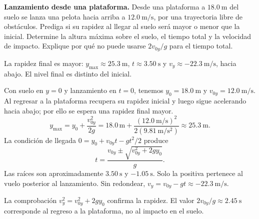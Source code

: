 \begin{ejercicio}
\textbf{Lanzamiento desde una plataforma.} Desde una plataforma a \(\SI{18.0}{\meter}\) del suelo se lanza una pelota hacia arriba a \(\SI{12.0}{\meter\per\second}\), por una trayectoria libre de obstáculos. Prediga si su rapidez al llegar al suelo será mayor o menor que la inicial. Determine la altura máxima sobre el suelo, el tiempo total y la velocidad de impacto. Explique por qué no puede usarse \(2v_{0y}/g\) para el tiempo total.
\end{ejercicio}
\begin{respuesta}
La rapidez final es mayor: \(y_{\max}\approx\SI{25.3}{\meter}\), \(t\approx\SI{3.50}{\second}\) y \(v_y\approx-\SI{22.3}{\meter\per\second}\), hacia abajo. El nivel final es distinto del inicial.
\end{respuesta}
\begin{explicacion}
Con suelo en \(y=0\) y lanzamiento en \(t=0\), tenemos \(y_0=\SI{18.0}{\meter}\) y \(v_{0y}=\SI{12.0}{\meter\per\second}\). Al regresar a la plataforma recupera su rapidez inicial y luego sigue acelerando hacia abajo; por ello se espera una rapidez final mayor.
\[ y_{\max}=y_0+\frac{v_{0y}^2}{2g}=18.0\,\si{\meter}+\frac{(\SI{12.0}{\meter\per\second})^2}{2(\SI{9.81}{\meter\per\second\squared})}\approx\SI{25.3}{\meter}. \]
La condición de llegada \(0=y_0+v_{0y}t-gt^2/2\) produce
\[ t=\frac{v_{0y}\pm\sqrt{v_{0y}^2+2gy_0}}{g}. \]
Las raíces son aproximadamente \(\SI{3.50}{\second}\) y \(-\SI{1.05}{\second}\). Solo la positiva pertenece al vuelo posterior al lanzamiento. Sin redondear, \(v_y=v_{0y}-gt\approx-\SI{22.3}{\meter\per\second}\).

La comprobación \(v_y^2=v_{0y}^2+2gy_0\) confirma la rapidez. El valor \(2v_{0y}/g\approx\SI{2.45}{\second}\) corresponde al regreso a la plataforma, no al impacto en el suelo.
\end{explicacion}


